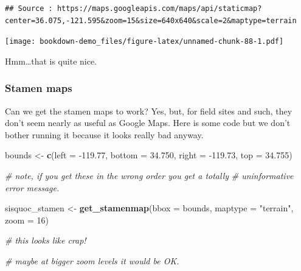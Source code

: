 \documentclass[]{book}
\newenvironment{Shaded}{\begin{snugshade}}{\end{snugshade}}
\newcommand{\KeywordTok}[1]{\textcolor[rgb]{0.13,0.29,0.53}{\textbf{{#1}}}}
\newcommand{\DataTypeTok}[1]{\textcolor[rgb]{0.13,0.29,0.53}{{#1}}}
\newcommand{\DecValTok}[1]{\textcolor[rgb]{0.00,0.00,0.81}{{#1}}}
\newcommand{\FloatTok}[1]{\textcolor[rgb]{0.00,0.00,0.81}{{#1}}}
\newcommand{\StringTok}[1]{\textcolor[rgb]{0.31,0.60,0.02}{{#1}}}
\newcommand{\CommentTok}[1]{\textcolor[rgb]{0.56,0.35,0.01}{\textit{{#1}}}}
\newcommand{\NormalTok}[1]{{#1}}
\theoremstyle{definition}
\theoremstyle{definition}
\theoremstyle{remark}
\begin{document}
\begin{Shaded}
\end{Shaded}

\begin{verbatim}
## Source : https://maps.googleapis.com/maps/api/staticmap?center=36.075,-121.595&zoom=15&size=640x640&scale=2&maptype=terrain
\end{verbatim}

\texttt{[image: bookdown-demo\_files/figure-latex/unnamed-chunk-88-1.pdf]}

Hmm\ldots{}that is quite nice.

\subsubsection{Stamen maps}\label{stamen-maps}

Can we get the stamen maps to work? Yes, but, for field sites and such,
they don't seem nearly as useful as Google Maps. Here is some code but
we don't bother running it because it looks really bad anyway.

\begin{Shaded}
\begin{Highlighting}[]
\NormalTok{bounds <-}\StringTok{ }\KeywordTok{c}\NormalTok{(}\DataTypeTok{left =} \NormalTok{-}\FloatTok{119.77}\NormalTok{, }
            \DataTypeTok{bottom =} \FloatTok{34.750}\NormalTok{,}
            \DataTypeTok{right =} \NormalTok{-}\FloatTok{119.73}\NormalTok{,}
            \DataTypeTok{top =} \FloatTok{34.755}\NormalTok{)}

\CommentTok{# note, if you get these in the wrong order you get a totally }
\CommentTok{# uninformative error message.}

\NormalTok{sisquoc_stamen <-}\StringTok{ }\KeywordTok{get_stamenmap}\NormalTok{(}\DataTypeTok{bbox =} \NormalTok{bounds, }\DataTypeTok{maptype =} \StringTok{"terrain"}\NormalTok{, }\DataTypeTok{zoom =} \DecValTok{16}\NormalTok{)}

\CommentTok{# this looks like crap!}

\CommentTok{# maybe at bigger zoom levels it would be OK.}
\end{Highlighting}
\end{Shaded}
\end{document}
